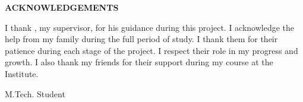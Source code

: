 \begin{center}
\huge{\textbf{ACKNOWLEDGEMENTS}}
\end{center}

I thank \supname, my supervisor, for his guidance during this project. I acknowledge the help from my family during the full period of study. I thank them for their patience during each stage of the project. I respect their role in my progress and growth. I also thank my friends for their support during my course at the Institute.

\vspace{1cm}
\authorname

\vspace{0.3cm}
M.Tech. Student

